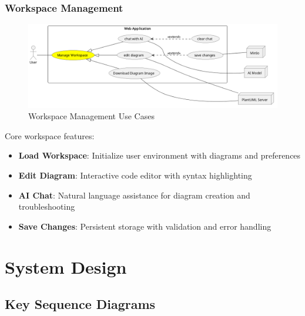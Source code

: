 \subsubsection{Workspace Management}
\begin{figure}[H]
\centering
\includegraphics[width=1\textwidth]{conception/SprintIV/use_case_diagrams/refined_use_case_feature_workspace_management.png}
\caption{Workspace Management Use Cases}
\end{figure}

Core workspace features:
\begin{itemize}
    \item \textbf{Load Workspace}: Initialize user environment with diagrams and preferences
    \item \textbf{Edit Diagram}: Interactive code editor with syntax highlighting
    \item \textbf{AI Chat}: Natural language assistance for diagram creation and troubleshooting
    \item \textbf{Save Changes}: Persistent storage with validation and error handling
\end{itemize}

\section{System Design}


\subsection{Key Sequence Diagrams}

